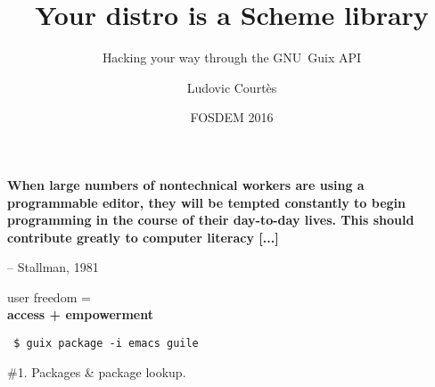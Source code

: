 \documentclass{beamer}
\title{Your distro is a Scheme library}
\subtitle{Hacking your way through the GNU~Guix API}
\author{Ludovic Courtès}
\date{\small{FOSDEM 2016}}
\begin{document}
\maketitle

\begin{frame}[plain]
\end{frame}

\begin{frame}[fragile]
  \textrm{\LARGE{\textbf{ When large numbers of nontechnical workers are
        using a programmable editor, they will be tempted constantly
        \alert{to begin programming} in the course of their day-to-day
        lives.  This should contribute greatly to computer literacy
        [...]
  }}}

  \vspace{1cm}
  \hfill{-- Stallman, 1981}
\end{frame}

\begin{frame}[plain]
  \Huge{user freedom =
    \\[0.8cm]
    \textbf{access + empowerment}}
\end{frame}

\begin{frame}[plain]
  \texttt{
    \Large{\$ guix package -i emacs guile}
  }
  \\[1cm]
\end{frame}

\begin{frame}[plain]
  \Huge{\#1. Packages \& package lookup.}
\end{frame}
\end{document}
